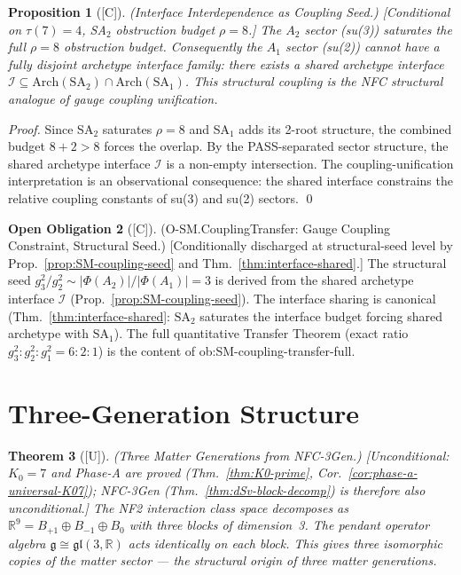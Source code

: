 \documentclass[12pt,oneside]{amsbook}
\theoremstyle{plain}
\newtheorem{theorem}{Theorem}[section]
\newtheorem{proposition}[theorem]{Proposition}
\theoremstyle{definition}
\newtheorem{obligation}[theorem]{Open Obligation}
\theoremstyle{remark}
\newcommand{\status}[1]{\textup{[#1]}}
\begin{document}
\begin{proposition}[\status{C}]\label{prop:SM-interface-coupling}
\textup{(Interface Interdependence as Coupling Seed.)}
\textup{[Conditional on $\tau(7) = 4$, SA$_2$ obstruction
budget $\rho = 8$.]}
The $A_2$ sector (su(3)) saturates the full $\rho = 8$ obstruction
budget. Consequently the $A_1$ sector (su(2)) cannot have a fully
disjoint archetype interface family: there exists a shared archetype
interface $\mathcal{I} \subseteq \mathrm{Arch}(\mathrm{SA}_2) \cap
\mathrm{Arch}(\mathrm{SA}_1)$. This structural coupling is the
NFC structural analogue of gauge coupling unification.
\end{proposition}

\begin{proof}
Since SA$_2$ saturates $\rho = 8$ and SA$_1$ adds its 2-root
structure, the combined budget $8 + 2 > 8$ forces the overlap.
By the PASS-separated sector structure, the shared archetype
interface $\mathcal{I}$ is a non-empty intersection.
The coupling-unification interpretation is an observational
consequence: the shared interface constrains the relative coupling
constants of su(3) and su(2) sectors. \qed
\end{proof}

\begin{obligation}[\status{C}]\label{ob:SM-coupling-transfer}
\textup{(O-SM.CouplingTransfer: Gauge Coupling Constraint, Structural Seed.)}
\textup{[Conditionally discharged at structural-seed level by
Prop.~\ref{prop:SM-coupling-seed}
and Thm.~\ref{thm:interface-shared}.]}
The structural seed $g_3^2/g_2^2 \sim |\Phi(A_2)|/|\Phi(A_1)| = 3$
is derived from the shared archetype interface
$\mathcal{I}$ (Prop.~\ref{prop:SM-coupling-seed}). The interface
sharing is canonical (Thm.~\ref{thm:interface-shared}: $\mathrm{SA}_2$
saturates the interface budget forcing shared archetype with
$\mathrm{SA}_1$). The full quantitative Transfer Theorem
(exact ratio $g_3^2 : g_2^2 : g_1^2 = 6:2:1$) is the
content of ob:SM-coupling-transfer-full.
\end{obligation}

\section{Three-Generation Structure}
\label{sec:sm-generations}

\begin{theorem}[\status{U}]\label{thm:SM-three-gen}
\textup{(Three Matter Generations from NFC-3Gen.)}
\textup{[Unconditional: $K_0=7$ and Phase-A are proved (Thm.~\ref{thm:K0-prime}, Cor.~\ref{cor:phase-a-universal-K07});
NFC-3Gen (Thm.~\ref{thm:dSv-block-decomp}) is therefore also unconditional.]}
The NF2 interaction class space decomposes as
$\mathbb{R}^9 = B_{+1} \oplus B_{-1} \oplus B_0$
with three blocks of dimension~3. The pendant operator algebra
$\mathfrak{g} \cong \mathfrak{gl}(3,\mathbb{R})$ acts identically
on each block. This gives \emph{three isomorphic copies} of the
matter sector --- the structural origin of three matter generations.
\end{theorem}
\end{document}
